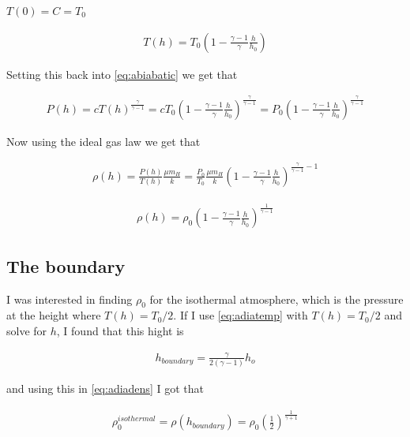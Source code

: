 \documentclass[a4paper, 10pt]{article}
\begin{document}
$T(0) = C = T_0$

\begin{align}\label{eq:adiatemp}
T(h) = T_0 \left( 1 -\frac{\gamma - 1}{\gamma} \frac{h}{h_0} \right)
\end{align}

Setting this back into \ref{eq:abiabatic} we get that

\begin{align}
P(h) = cT(h)^{\frac{\gamma}{\gamma-1}} = cT_0 \left( 1 -\frac{\gamma - 1}{\gamma} \frac{h}{h_0} \right)^{\frac{\gamma}{\gamma-1}} = P_0\left( 1 -\frac{\gamma - 1}{\gamma} \frac{h}{h_0} \right)^{\frac{\gamma}{\gamma-1}}
\end{align}

Now using the ideal gas law we get that

\begin{align}
\rho (h) = \frac{P(h)}{T(h)}\frac{\mu m_H}{k} = \frac{P_0}{T_0}\frac{\mu m_H}{k}\left( 1 -\frac{\gamma - 1}{\gamma} \frac{h}{h_0} \right)^{\frac{\gamma}{\gamma-1} - 1}
\end{align}

\begin{align}\label{eq:adiadens}
\rho (h) = \rho_0 \left(1-\frac{\gamma - 1}{\gamma} \frac{h}{h_0}\right)^{\frac{1}{\gamma - 1}}
\end{align}

\subsection{The boundary}
I was interested in finding $\rho_0$ for the isothermal atmosphere, which is the pressure at the height where $T(h) = T_0/2$. If I use \ref{eq:adiatemp} with  $T(h) = T_0/2$ and solve for $h$, I found that this hight is

\begin{align}
h_{boundary} = \frac{\gamma}{2(\gamma -1)}h_o
\end{align}

and using this in \ref{eq:adiadens} I got that 

\begin{align}
\rho_0^{isothermal} = \rho(h_{boundary}) = \rho_0 \left(\frac{1}{2} \right) ^{\frac{1}{\gamma +1}}
\end{align}


 

\end{document}
